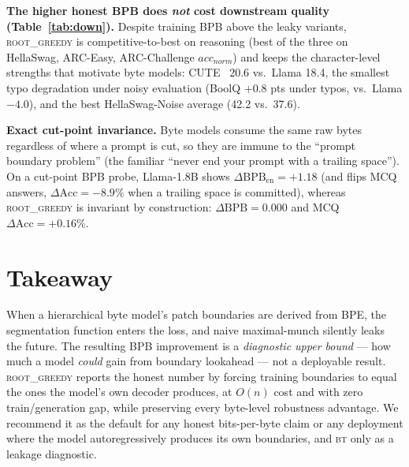 \documentclass{article} %
\newcommand{\rg}{\textsc{root\_greedy}}
\newcommand{\bt}{\textsc{bt}}
\begin{document}
\noindent\textbf{The higher honest BPB does \emph{not} cost downstream quality
(Table~\ref{tab:down}).} Despite training BPB above the leaky variants, \rg{} is competitive-to-best
on reasoning (best of the three on HellaSwag, ARC-Easy, ARC-Challenge $acc_{norm}$) and keeps the
character-level strengths that motivate byte models: CUTE~\citep{edman2024cute} 20.6 vs.\ Llama 18.4, the smallest typo
degradation under noisy evaluation (BoolQ $+0.8$ pts under typos, vs.\ Llama $-4.0$), and the best
HellaSwag-Noise average (42.2 vs.\ 37.6).

\noindent\textbf{Exact cut-point invariance.} Byte models consume the same raw bytes regardless of
where a prompt is cut, so they are immune to the ``prompt boundary problem'' (the familiar
``never end your prompt with a trailing space''). On a cut-point BPB probe, Llama-1.8B shows
$\Delta\text{BPB}_{\text{en}}=+1.18$ (and flips MCQ answers, $\Delta\text{Acc}=-8.9\%$ when a trailing
space is committed), whereas \rg{} is invariant by construction: $\Delta\text{BPB}=0.000$ and MCQ
$\Delta\text{Acc}=+0.16\%$.

\section{Takeaway}
\vspace{-2pt}
When a hierarchical byte model's patch boundaries are derived from BPE, the segmentation function
enters the loss, and naive maximal-munch silently leaks the future. The resulting BPB improvement is
a \emph{diagnostic upper bound} --- how much a model \emph{could} gain from boundary lookahead --- not
a deployable result. \rg{} reports the honest number by forcing training boundaries to equal the
ones the model's own decoder produces, at $O(n)$ cost and with zero train/generation gap, while
preserving every byte-level robustness advantage. We recommend it as the default for any honest
bits-per-byte claim or any deployment where the model autoregressively produces its own boundaries,
and \bt{} only as a leakage diagnostic.



\end{document}
